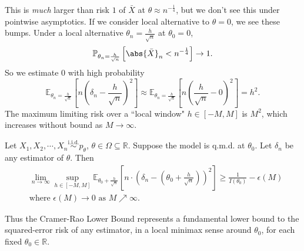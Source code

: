 \documentclass[a4paper]{article}
\begin{document}
\begin{eg}
\begin{center}
	\end{center}
	This is \emph{much} larger than risk $1$ of $\bar{X}$ at $\theta \approx n^{-\frac{1}{4}}$, but we don't see this under pointwise asymptotics. If we consider local alternative to $\theta = 0$, we see these bumps. Under a local alternative $\theta_n = \frac{h}{\sqrt{n}}$ at $\theta_0 = 0$,
	\begin{equation*}
		\mathbb{P}_{\theta_n = \frac{h}{\sqrt{n}}} \left[\abs{\bar{X}}_n < n^{-\frac{1}{4}}\right] \to 1.
	\end{equation*}
	So we estimate $0$ with high probability
	\begin{equation*}
		\mathbb{E}_{\theta_n = \frac{h}{\sqrt{n}}} \left[n\left(\delta_n - \frac{h}{\sqrt{n}}\right)^2\right] \approx \mathbb{E}_{\theta_n = \frac{h}{\sqrt{n}}} \left[n \left(\frac{h}{\sqrt{n}} - 0\right)^2\right] = h^2.
	\end{equation*}
	The maximum limiting risk over a ``local window" $h \in [-M,M]$ is $M^2$, which increases without bound as $M \to \infty$.
\end{eg}

\begin{thm}
	Let $X_1, X_2,\cdots,X_n \stackrel{\text{i.i.d.}}{\sim} p_{\theta}$, $\theta \in \Omega \subseteq \mathbb{R}$. Suppose the model is q.m.d. at $\theta_0$. Let $\delta_n$ be any estimator of $\theta$. Then
	\begin{equation}
		\begin{aligned}
			& \lim\limits_{n \to \infty} \sup\limits_{h \in [-M,M]} \mathbb{E}_{\theta_0+\frac{h}{\sqrt{n}}} \left[n \cdot \left(\delta_n - \left(\theta_0 + \frac{h}{\sqrt{n}}\right)\right)^2\right] \geq \frac{1}{I(\theta_0)} - \epsilon(M) \\
			& \text{where } \epsilon(M) \to 0 \text{ as } M \nearrow \infty.
		\end{aligned}
	\end{equation}
\end{thm}

\begin{remark}
	Thus the Cramer-Rao Lower Bound represents a fundamental lower bound to the squared-error risk of any estimator, in a local minimax sense around $\theta_0$, for each fixed $\theta_0 \in \mathbb{R}$.
\end{remark}
\end{document}
